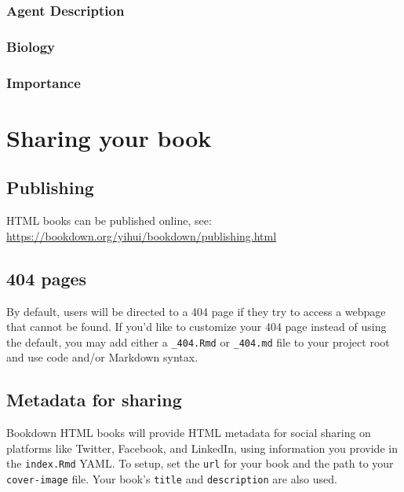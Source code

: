 \documentclass[
]{book}
\begin{document}
\subsection*{Agent Description}\label{agent-description-15}

\subsection*{Biology}\label{biology-15}

\subsection*{Importance}\label{importance-15}

\chapter{Sharing your book}\label{sharing-your-book}

\section{Publishing}\label{publishing}

HTML books can be published online, see: \url{https://bookdown.org/yihui/bookdown/publishing.html}

\section{404 pages}\label{pages}

By default, users will be directed to a 404 page if they try to access a webpage that cannot be found. If you'd like to customize your 404 page instead of using the default, you may add either a \texttt{\_404.Rmd} or \texttt{\_404.md} file to your project root and use code and/or Markdown syntax.

\section{Metadata for sharing}\label{metadata-for-sharing}

Bookdown HTML books will provide HTML metadata for social sharing on platforms like Twitter, Facebook, and LinkedIn, using information you provide in the \texttt{index.Rmd} YAML. To setup, set the \texttt{url} for your book and the path to your \texttt{cover-image} file. Your book's \texttt{title} and \texttt{description} are also used.
\end{document}
